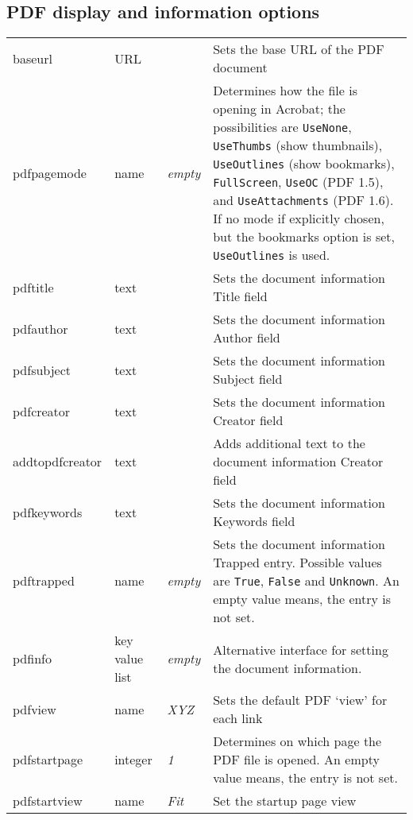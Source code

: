 \documentclass{article}
\begin{document}
\subsection{PDF display and information options}
\begin{longtable}{@{}>{\ttfamily}l>{\raggedright}p{}>{\itshape}lp{7cm}@{}}
baseurl            & URL     &       & Sets the base URL of the PDF document \\
pdfpagemode        & name    & empty & Determines how the file is opening in Acrobat; the possibilities are
                                       \verb|UseNone|, \verb|UseThumbs| (show thumbnails), \verb|UseOutlines|
                                       (show bookmarks), \verb|FullScreen|, \verb|UseOC| (PDF 1.5),
                                       and \verb|UseAttachments| (PDF 1.6). If no mode if explicitly chosen, but the
                                       bookmarks option is set, \verb|UseOutlines| is used. \\
pdftitle           & text    &       & Sets the document information Title field \\
pdfauthor          & text    &       & Sets the document information Author field \\
pdfsubject         & text    &       & Sets the document information Subject field \\
pdfcreator         & text    &       & Sets the document information Creator field \\
addtopdfcreator    & text    &       & Adds additional text to the document information Creator field \\
pdfkeywords        & text    &       & Sets the document information Keywords field \\
pdftrapped         & name    & empty & Sets the document information Trapped entry. Possible values are \verb|True|, \verb|False| and \verb|Unknown|.
                                       An empty value means, the entry is not set.\\
%
pdfinfo            & key value list  & empty & Alternative interface for setting the
                                       document information.\\
pdfview            & name    & XYZ   & Sets the default PDF `view' for each link \\
pdfstartpage       & integer & 1     & Determines on which page the PDF file is opened. An empty value means, the entry is not set.\\
pdfstartview       & name    & Fit   & Set the startup page view \\

\end{longtable}
\end{document}
